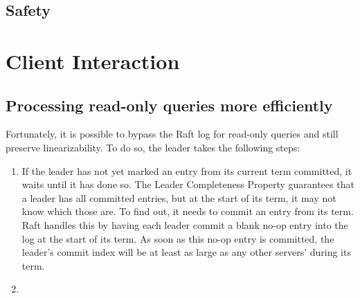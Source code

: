 \documentclass[11pt]{article}
\begin{document}
\subsection{Safety}
\label{sec:orgad779d2}
\section{Client Interaction}
\label{sec:org006140c}
\subsection{Processing read-only queries more efficiently}
\label{sec:orgf5c2332}
Fortunately, it is possible to bypass the Raft log for read-only queries and still preserve
linearizability. To do so, the leader takes the following steps:
\begin{enumerate}
\item If the leader has not yet marked an entry from its current term committed, it waits until it has
done so. The Leader Completeness Property guarantees that a leader has all committed entries, but
at the start of its term, it may not know which those are. To find out, it needs to commit an entry
from its term. Raft handles this by having each leader commit a blank no-op entry into the log at
the start of its term. As soon as this no-op entry is committed, the leader's commit index will be at least as large as any other servers' during its term.
\item 
\end{enumerate}
\end{document}
